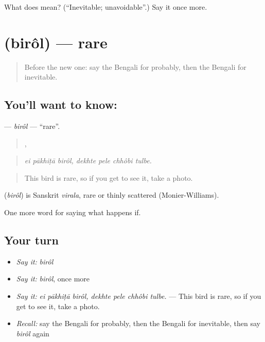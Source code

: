 \begin{tcolorbox}[breakable,colback=teal!4,colframe=teal!35!black,title={Before you move on}]
What does  mean? (\textquotedblleft{}Inevitable; unavoidable\textquotedblright{}.) Say it once more.
\end{tcolorbox}
\section[\texorpdfstring{\bn{বিরল} (birôl)}{বিরল (birôl)}]{ (birôl) — rare}

\label{lesson:BN-C366-birol}



\begin{quote}
Before the new one: say the Bengali for probably, then the Bengali for inevitable.
\end{quote}

\subsection*{You'll want to know: }
\textbf{} — \emph{birôl} — \textquotedblleft{}rare\textquotedblright{}.

\begin{quote}
  ,    
\end{quote}

\begin{quote}
\emph{ei pākhiṭā birôl, dekhte pele chhôbi tulbe.}
\end{quote}

\begin{quote}
This bird is rare, so if you get to see it, take a photo.
\end{quote}

\begin{cousinweb}
\textbf{} (\emph{birôl}) is Sanskrit \emph{virala}, rare or thinly scattered (Monier-Williams).
\end{cousinweb}

\begin{grammarlens}[title={What you've built}]
One more word for saying what happens if.
\end{grammarlens}

\subsection*{Your turn}
\begin{itemize}
\raggedright
  \item \emph{Say it:} \emph{birôl}
  \item \emph{Say it:} \emph{birôl}, once more
  \item \emph{Say it:} \emph{ei pākhiṭā birôl, dekhte pele chhôbi tulbe.} — This bird is rare, so if you get to see it, take a photo.
  \item \emph{Recall:} say the Bengali for probably, then the Bengali for inevitable, then say \emph{birôl} again
\end{itemize}

